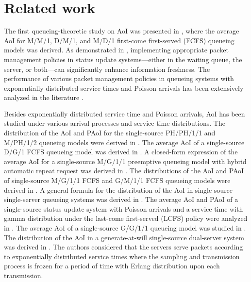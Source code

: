 \section{Related work}
The first queueing-theoretic study on AoI was presented in \cite{6195689}, where the average AoI for M/M/1, D/M/1, and M/D/1 first-come first-served (FCFS) queueing models was derived. 
As demonstrated in \cite{6310931,7415972}, implementing appropriate packet management policies in status update systems—either in the waiting queue, the server, or both—can significantly enhance information freshness.
The performance of various packet management policies in queueing systems with exponentially distributed service times and Poisson arrivals has been extensively analyzed in the literature \cite{8469047,8437591,8406966,8437907,9013935,9048914,9252168,9162681,Moltafet2020mgf,9611498,9705518}.


Besides exponentially distributed service time and Poisson arrivals, AoI has been studied under various arrival processes and service time distributions. 
 The distribution of the AoI and PAoI for the single-source PH/PH/1/1 and M/PH/1/2 queueing models were derived in \cite{9119460}.
The average AoI of a single-source D/G/1 FCFS  queueing model was derived in \cite{8406909}. A closed-form expression of the average AoI for a single-source  M/G/1/1 preemptive queueing model with hybrid automatic repeat request was derived in \cite{8006504}. The distributions of the AoI and PAoI of single-source  M/G/1/1 FCFS and G/M/1/1 FCFS queueing models were derived in \cite{8006592}.
A general formula for the distribution of the AoI in single-source single-server queueing systems was derived in \cite{8820073}. 
The average AoI and PAoI of a single-source status update system with Poisson arrivals and a service time with gamma distribution under the last-come first-served (LCFS) policy were analyzed in \cite{7541764}. 
The average AoI of a single-source G/G/1/1 queueing model was studied in \cite{9048933}. 
The distribution of the AoI in a generate-at-will single-source dual-server system was derived in \cite{Arxakar2024age}. The authors considered that the servers serve packets according to exponentially distributed service times where the sampling and transmission process is frozen for a period of time with  Erlang distribution upon each transmission.

